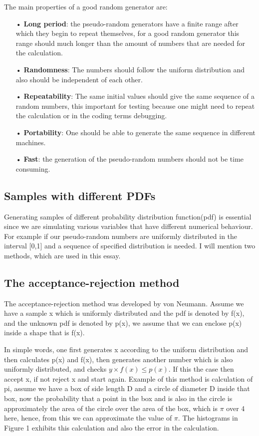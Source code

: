 The main properties of a good random generator are:

\begin{itemize}
\item[•]\textbf{Long period}: the pseudo-random generators have a finite range after which they begin to repeat themselves, for a good random generator this range should much longer than the amount of numbers that are needed for the calculation. 

\item[•]\textbf{Randomness}: The numbers should follow the uniform distribution and also should be independent of each other. 

\item[•]\textbf{Repeatability}: The same initial values should give the same sequence of a random numbers, this important for testing because one might need to repeat the calculation or in the coding terms debugging.

\item[•]\textbf{Portability}: One should be able to generate the same sequence in different machines. 

\item[•]\textbf{Fast}: the generation of the pseudo-random numbers should not be time consuming\citep{Weinzierl}.    
\end{itemize}



\subsection{Samples with different PDFs}
Generating samples of different probability distribution function(pdf) is essential since we are simulating various variables that have different numerical behaviour. For example if our pseudo-random numbers are uniformly distributed in the interval [0,1] and a sequence of specified distribution is needed. I will mention two methods, which are used in this essay. 

\subsection{The acceptance-rejection method}
The acceptance-rejection method was developed by von Neumann. Assume we have a sample x which is uniformly distributed and the pdf is denoted by f(x), and the unknown pdf is denoted by p(x), we assume that we can enclose p(x) inside a shape that is f(x).

In simple words, one first generates x according to the uniform distribution and then calculates p(x) and f(x), then generates another number which is also uniformly distributed, and checks  $y \times f(x) \leq p(x)$. If this the case then accept x, if not reject x and start again. Example of this method is calculation of pi, assume we have a box of side length D and a circle of diameter D inside that box, now the probability that a point in the box and is also in the circle is approximately the area of the circle over the area of the box, which is $\pi$ over 4 here, hence, from this we can approximate the value of $\pi$. The histograms in Figure 1 exhibits this calculation and also the error in the calculation\citep{Weinzierl}. 

